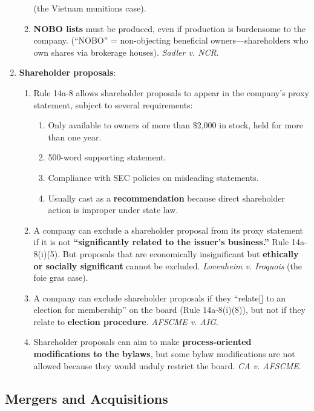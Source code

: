 \begin{enumerate}
\begin{enumerate}
        (the Vietnam munitions case).
        \item \textbf{NOBO lists} must be produced, even if production is 
        burdensome to the company. (``NOBO'' = non-objecting beneficial 
        owners---shareholders who own shares via brokerage houses). 
        \emph{Sadler v. NCR}.
    \end{enumerate}
    \item \textbf{Shareholder proposals}:
    \begin{enumerate}
        \item Rule 14a-8 allows shareholder proposals to appear in the 
        company's proxy statement, subject to several requirements:
        \begin{enumerate}
            \item Only available to owners of more than \$2,000 in stock, 
            held for more than one year.
            \item 500-word supporting statement.
            \item Compliance with SEC policies on misleading statements.
            \item Usually cast as a \textbf{recommendation} because direct 
            shareholder action is improper under state law.
        \end{enumerate}
        \item A company can exclude a shareholder proposal from its proxy 
        statement if it is not \textbf{``significantly related to the issuer's 
        business.''} Rule 14a-8(i)(5). But proposals that are economically 
        insignificant but \textbf{ethically or socially significant} cannot be 
        excluded. \emph{Lovenheim v. Iroquois} (the foie gras case).
        \item A company can exclude shareholder proposals if they ``relate[] 
        to an election for membership'' on the board (Rule 14a-8(i)(8)), but 
        not if they relate to \textbf{election procedure}. \emph{AFSCME v. 
        AIG}.
        \item Shareholder proposals can aim to make \textbf{process-oriented 
        modifications to the bylaws}, but some bylaw modifications are not 
        allowed because they would unduly restrict the board. \emph{CA v. 
        AFSCME}.
    \end{enumerate}
\end{enumerate}

\newpage

\subsection{Mergers and Acquisitions}

